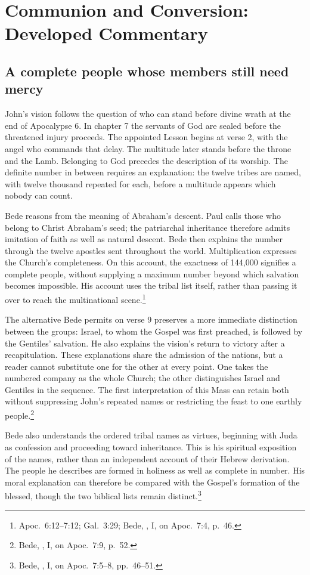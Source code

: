 \section{Communion and Conversion: Developed Commentary}

\subsection{A complete people whose members still need mercy}
John's vision follows the question of who can stand before divine wrath
at the end of Apocalypse 6. In chapter 7 the servants of God are sealed
before the threatened injury proceeds. The appointed Lesson begins at
verse 2, with the angel who commands that delay. The multitude later
stands before the throne and the Lamb. Belonging to God precedes the
description of its worship. The definite number in between requires an
explanation: the twelve tribes are named, with twelve thousand repeated
for each, before a multitude appears which nobody can count.

Bede reasons from the meaning of Abraham's descent. Paul calls those who
belong to Christ Abraham's seed; the patriarchal inheritance therefore
admits imitation of faith as well as natural descent. Bede then explains
the number through the twelve apostles sent throughout the world.
Multiplication expresses the Church's completeness. On this account,
the exactness of 144,000 signifies a complete people, without supplying
a maximum number beyond which salvation becomes impossible. His account
uses the tribal list itself, rather than passing it over to reach the
multinational scene.\footnote{Apoc.~6:12--7:12; Gal.~3:29; Bede,
, I, on Apoc.~7:4, p.~46.}

The alternative Bede permits on verse 9 preserves a more immediate
distinction between the groups: Israel, to whom the Gospel was first
preached, is followed by the Gentiles' salvation. He also explains
the vision's return to victory after a recapitulation. These explanations
share the admission of the nations, but a reader cannot substitute
one for the other at every point. One takes the numbered company as
the whole Church; the other distinguishes Israel and Gentiles in the
sequence. The first interpretation of this Mass can retain both
without suppressing John's repeated names or restricting the feast
to one earthly people.\footnote{Bede, , I,
on Apoc.~7:9, p.~52.}

Bede also understands the ordered tribal names as virtues, beginning with
Juda as confession and proceeding toward inheritance. This is his spiritual
exposition of the names, rather than an independent account of their
Hebrew derivation. The people he describes are formed in holiness as well
as complete in number. His moral explanation can therefore be compared
with the Gospel's formation of the blessed, though the two biblical lists
remain distinct.\footnote{Bede, , I,
on Apoc.~7:5--8, pp.~46--51.}

